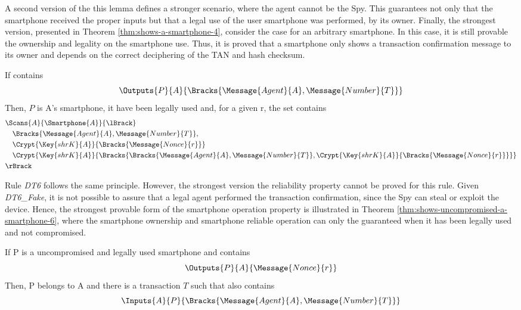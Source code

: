 A second version of the this lemma defines a stronger scenario, where the agent cannot be the Spy. This guarantees not only that the smartphone received the proper inputs but that a legal use of the user smartphone was performed, by its owner. Finally, the strongest version, presented in Theorem \ref{thm:shows-a-smartphone-4}, consider the case for an arbitrary smartphone. In this case, it is still provable the ownership and legality on the smartphone use. Thus, it is proved that a smartphone only shows a transaction confirmation message to its owner and depends on the correct deciphering of the TAN and hash checksum.

\begin{theorem}
\label{thm:shows-a-smartphone-4}
  If  contains
  \[\Outputs{P}{A}{\Bracks{\Message{Agent}{A}, \Message{Number}{T}}}\]
  Then, $P$ is A's smartphone, it have been legally used and, for a given r, the set  contains
  \begin{align*}
    & \Scans{A}{\Smartphone{A}}{\lBrack} \\
      & \quad \Bracks{\Message{Agent}{A}, \Message{Number}{T}}, \\
      & \quad \Crypt{\Key{shrK}{A}}{\Bracks{\Message{Nonce}{r}}} \\
      & \quad \Crypt{\Key{shrK}{A}}{\Bracks{\Bracks{\Message{Agent}{A}, \Message{Number}{T}},\Crypt{\Key{shrK}{A}}{\Bracks{\Message{Nonce}{r}}}}} \\
    & \rBrack
  \end{align*}
\end{theorem}

Rule \textit{DT6} follows the same principle. However, the strongest version the reliability property cannot be proved for this rule. Given \textit{DT6\_Fake}, it is not possible to assure that a legal agent performed the transaction confirmation, since the Spy can steal or exploit the device. Hence, the strongest provable form of the smartphone operation property is illustrated in Theorem \ref{thm:shows-uncompromised-a-smartphone-6}, where the smartphone ownership and smartphone reliable operation can only the guaranteed when it has been legally used and not compromised.

\begin{theorem}
  \label{thm:shows-uncompromised-a-smartphone-6}
  If P is a uncompromised and legally used smartphone and  contains
  \[\Outputs{P}{A}{\Message{Nonce}{r}}\]
  Then, P belongs to A and there is a transaction \(T\) such that  also contains
  \[\Inputs{A}{P}{\Bracks{\Message{Agent}{A}, \Message{Number}{T}}}\]
\end{theorem}

